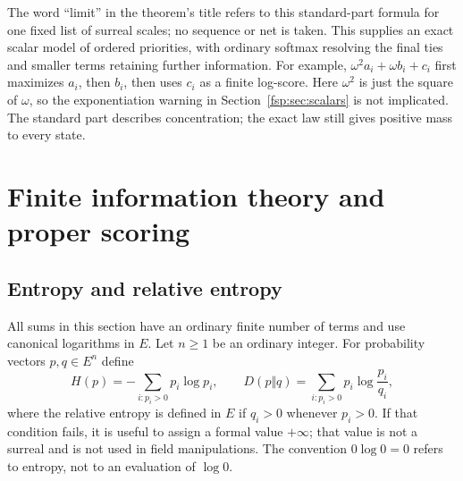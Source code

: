 \documentclass[11pt,a4paper]{article}
\numberwithin{equation}{section}
\theoremstyle{definition}
\theoremstyle{remark}
\begin{document}
The word ``limit'' in the theorem's title refers to this standard-part
formula for one fixed list of surreal scales; no sequence or net is taken.
This supplies an exact scalar model of ordered priorities, with ordinary
softmax resolving the final ties and smaller terms retaining further
information. For example, $\omega^2 a_i+\omega b_i+c_i$ first maximizes
$a_i$, then $b_i$, then uses $c_i$ as a finite log-score. Here $\omega^2$
is just the square of $\omega$, so the exponentiation warning in
Section~\ref{fsp:sec:scalars} is not implicated. The standard part describes
concentration; the exact law still gives positive mass to every state.

\section{Finite information theory and proper scoring}
\label{fsp:sec:information}

\subsection{Entropy and relative entropy}

All sums in this section have an ordinary finite number of terms and use
canonical logarithms in $E$. Let $n\ge1$ be an ordinary integer.
For probability vectors $p,q\in E^n$ define
\begin{equation}\label{fsp:eq:entropy}
 H(p)=-\sum_{i:p_i>0}p_i\log p_i,\qquad
 D(p\Vert q)=\sum_{i:p_i>0}p_i\log\frac{p_i}{q_i},
\end{equation}
where the relative entropy is defined in $E$ if $q_i>0$ whenever $p_i>0$.
If that condition fails, it is useful to assign a formal value $+\infty$;
that value is not a surreal and is not used in field manipulations.
The convention $0\log0=0$ refers to entropy, not to an evaluation of
$\log0$.
\end{document}
